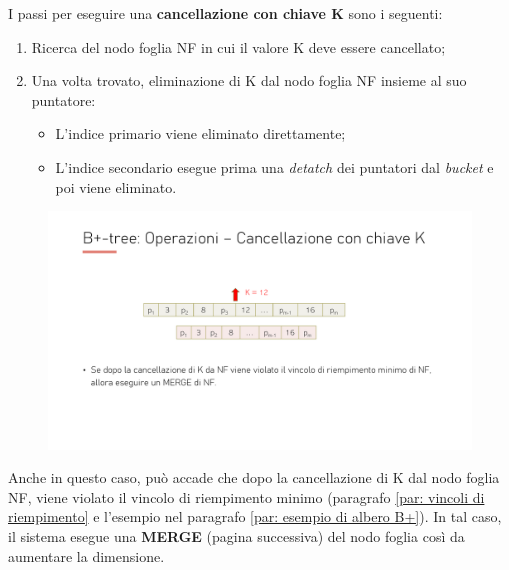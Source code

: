 \documentclass[a4paper]{article}
\begin{document}
	I passi per eseguire una \textcolor{Red3}{\textbf{cancellazione con chiave K}} sono i seguenti:
	\begin{enumerate}
		\item Ricerca del nodo foglia NF in cui il valore K deve essere cancellato;
		
		\item Una volta trovato, eliminazione di K dal nodo foglia NF insieme al suo puntatore:
		\begin{itemize}
			\item L'indice primario viene eliminato direttamente;
			
			\item L'indice secondario esegue prima una \emph{detatch} dei puntatori dal \emph{bucket} e poi viene eliminato.
		\end{itemize}
	\end{enumerate}
	\begin{figure}[!htp]
		\centering
		\includegraphics[width=.7\textwidth]{img/eliminazione-1.pdf}
	\end{figure}
	
	\noindent
	Anche in questo caso, può accade che dopo la cancellazione di K dal nodo foglia NF, viene violato il vincolo di riempimento minimo (paragrafo \ref{par: vincoli di riempimento} e l'esempio nel paragrafo \ref{par: esempio di albero B+}). In tal caso, il sistema esegue una \textbf{MERGE} (pagina successiva) del nodo foglia così da aumentare la dimensione.\newpage
	
\end{document}
